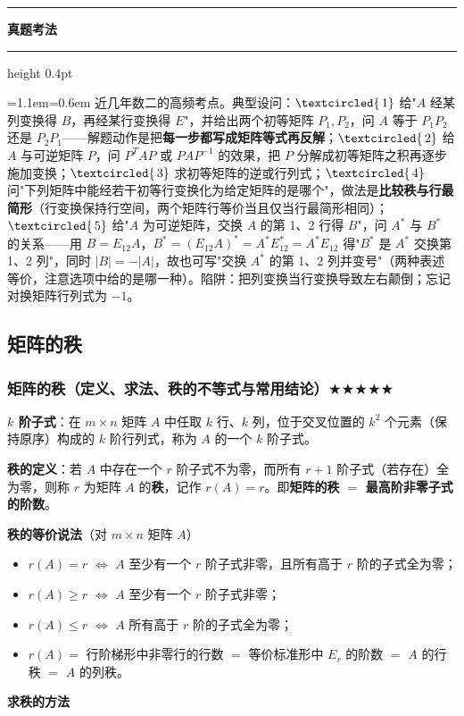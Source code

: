 \documentclass[11pt,openany,UTF8]{ctexbook}
\newcommand{\circled}[1]{\textcircled{\scriptsize\,#1}}
\newcommand{\callouthead}[2]{%
  \par\addvspace{7pt}\noindent
  {\color{#1}\rule[-0.15em]{3pt}{1.05em}}\hspace{0.5em}%
  {\bfseries\color{#1}#2}\par\nobreak\vspace{-0.35em}%
  {\color{rulesep}\hrule height 0.4pt}\nobreak\vspace{0.45em}%
  \begingroup\small\setlength{\parindent}{0pt}%
  \leftskip=1.1em\rightskip=0.6em\noindent\ignorespaces}
\newcommand{\calloutend}{\par\endgroup\addvspace{7pt}}
\newenvironment{callexam}[1]{\callouthead{exambar}{#1}}{\calloutend}
\begin{document}
\begin{callexam}{真题考法}
近几年数二的高频考点。典型设问：$\circled{1}$ 给"$A$ 经某列变换得 $B$，再经某行变换得 $E$"，并给出两个初等矩阵 $P_1,P_2$，问 $A$ 等于 $P_1P_2$ 还是 $P_2P_1$——解题动作是把\textbf{每一步都写成矩阵等式再反解}；$\circled{2}$ 给 $A$ 与可逆矩阵 $P$，问 $P^TAP$ 或 $PAP^{-1}$ 的效果，把 $P$ 分解成初等矩阵之积再逐步施加变换；$\circled{3}$ 求初等矩阵的逆或行列式；$\circled{4}$ 问"下列矩阵中能经若干初等行变换化为给定矩阵的是哪个"，做法是\textbf{比较秩与行最简形}（行变换保持行空间，两个矩阵行等价当且仅当行最简形相同）；$\circled{5}$ 给"$A$ 为可逆矩阵，交换 $A$ 的第 1、2 行得 $B$"，问 $A^*$ 与 $B^*$ 的关系——用 $B=E_{12}A$，$B^*=(E_{12}A)^*=A^*E_{12}^*=A^*E_{12}$ 得"$B^*$ 是 $A^*$ 交换第 1、2 列"，同时 $\vert B\vert=-\vert A\vert$，故也可写"交换 $A^*$ 的第 1、2 列并变号"（两种表述等价，注意选项中给的是哪一种）。陷阱：把列变换当行变换导致左右颠倒；忘记对换矩阵行列式为 $-1$。

\end{callexam}

\subsection{矩阵的秩}

\subsubsection{矩阵的秩（定义、求法、秩的不等式与常用结论）$\bigstar$$\bigstar$$\bigstar$$\bigstar$$\bigstar$}

\textbf{$k$ 阶子式}：在 $m\times n$ 矩阵 $A$ 中任取 $k$ 行、$k$ 列，位于交叉位置的 $k^2$ 个元素（保持原序）构成的 $k$ 阶行列式，称为 $A$ 的一个 $k$ 阶子式。

\textbf{秩的定义}：若 $A$ 中存在一个 $r$ 阶子式不为零，而所有 $r+1$ 阶子式（若存在）全为零，则称 $r$ 为矩阵 $A$ 的\textbf{秩}，记作 $r(A)=r$。即\textbf{矩阵的秩 $=$ 最高阶非零子式的阶数}。

\textbf{秩的等价说法}（对 $m\times n$ 矩阵 $A$）

\begin{itemize}
\item $r(A)=r$ $\iff$ $A$ 至少有一个 $r$ 阶子式非零，且所有高于 $r$ 阶的子式全为零；
\item $r(A)\ge r$ $\iff$ $A$ 至少有一个 $r$ 阶子式非零；
\item $r(A)\le r$ $\iff$ $A$ 所有高于 $r$ 阶的子式全为零；
\item $r(A)=$ 行阶梯形中非零行的行数 $=$ 等价标准形中 $E_r$ 的阶数 $=$ $A$ 的行秩 $=$ $A$ 的列秩。
\end{itemize}
\textbf{求秩的方法}
\end{document}
